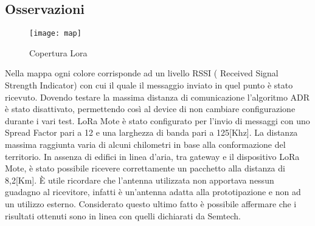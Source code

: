 \subsection{Osservazioni}

\begin{figure}[th]
        \centering 
                \texttt{[image: map]}
        \caption{Copertura Lora}
        \label{fig:map}
\end{figure}
Nella mappa ogni colore corrisponde ad un livello  RSSI ( Received Signal
Strength Indicator) con cui il quale il messaggio inviato in quel punto è stato
ricevuto.  Dovendo testare la massima distanza di comunicazione l'algoritmo ADR
è stato disattivato, permettendo così al device di non cambiare configurazione
durante i vari test.  LoRa Mote è stato configurato per l'invio di messaggi con
uno Spread Factor pari a 12 e una larghezza di banda pari a 125[Khz]. 
La distanza massima raggiunta varia di alcuni chilometri in base
alla conformazione del territorio. In assenza di edifici in linea d'aria, tra
gateway e il dispositivo LoRa Mote, è stato possibile ricevere correttamente un
pacchetto alla distanza di 8,2[Km].  È utile ricordare che l'antenna utilizzata non apportava nessun guadagno al
ricevitore, infatti è un'antenna adatta alla prototipazione e non ad un
utilizzo esterno.
Considerato questo ultimo fatto è possibile affermare che i risultati ottenuti sono in
linea con quelli dichiarati da Semtech.
